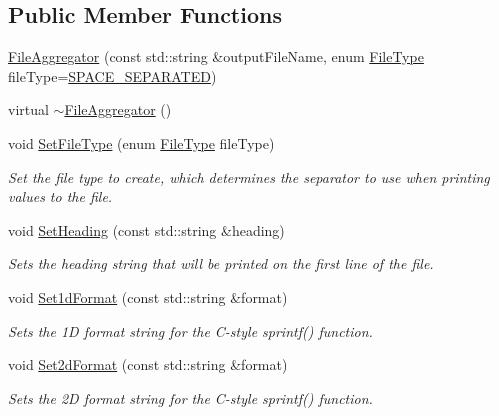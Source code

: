 \subsection*{Public Member Functions}
\begin{DoxyCompactItemize}
\item 
\hyperlink{classns3_1_1FileAggregator_a515b06ad554b5bae50f630a5628a0d87}{File\+Aggregator} (const std\+::string \&output\+File\+Name, enum \hyperlink{classns3_1_1FileAggregator_aedb3108205a498f7ac0c564508067e2d}{File\+Type} file\+Type=\hyperlink{classns3_1_1FileAggregator_aedb3108205a498f7ac0c564508067e2daa06fea1225d5be6eefc92c12abc4bd0b}{S\+P\+A\+C\+E\+\_\+\+S\+E\+P\+A\+R\+A\+T\+ED})
\item 
virtual \hyperlink{classns3_1_1FileAggregator_af88ce91a80dd53a906c05c16ec2aee4d}{$\sim$\+File\+Aggregator} ()
\item 
void \hyperlink{classns3_1_1FileAggregator_a4d8373ae7f883ae4167aa81d007157fa}{Set\+File\+Type} (enum \hyperlink{classns3_1_1FileAggregator_aedb3108205a498f7ac0c564508067e2d}{File\+Type} file\+Type)
\begin{DoxyCompactList}\small\item\em Set the file type to create, which determines the separator to use when printing values to the file. \end{DoxyCompactList}\item 
void \hyperlink{classns3_1_1FileAggregator_abfac861b56449e49670269a3f1aca89e}{Set\+Heading} (const std\+::string \&heading)
\begin{DoxyCompactList}\small\item\em Sets the heading string that will be printed on the first line of the file. \end{DoxyCompactList}\item 
void \hyperlink{classns3_1_1FileAggregator_a9728dc5cc40abca29296a02cb2e471b8}{Set1d\+Format} (const std\+::string \&format)
\begin{DoxyCompactList}\small\item\em Sets the 1D format string for the C-\/style sprintf() function. \end{DoxyCompactList}\item 
void \hyperlink{classns3_1_1FileAggregator_a6b963cb9592d52d30095b2805ef02a56}{Set2d\+Format} (const std\+::string \&format)
\begin{DoxyCompactList}\small\item\em Sets the 2D format string for the C-\/style sprintf() function. \end{DoxyCompactList}\item 

\end{DoxyCompactItemize}
